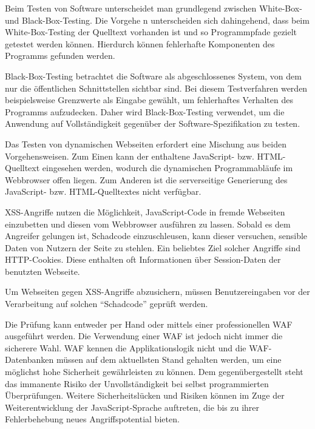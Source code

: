 Beim Testen von Software unterscheidet man grundlegend zwischen White-Box- und Black-Box-Testing. Die Vorgehe n unterscheiden sich dahingehend, dass beim White-Box-Testing der Quelltext vorhanden ist und so Programmpfade gezielt getestet werden können. Hierdurch können fehlerhafte Komponenten des Programms gefunden werden.

Black-Box-Testing betrachtet die Software als abgeschlossenes System, von dem nur die öffentlichen Schnittstellen sichtbar sind. Bei diesem Testverfahren werden beispielsweise Grenzwerte als Eingabe gewählt, um fehlerhaftes Verhalten des Programms aufzudecken. Daher wird Black-Box-Testing verwendet, um die Anwendung auf Vollständigkeit gegenüber der Software-Spezifikation zu testen.

Das Testen von dynamischen Webseiten erfordert eine Mischung aus beiden Vorgehensweisen. Zum Einen kann der enthaltene JavaScript- bzw. HTML-Quelltext eingesehen werden, wodurch die dynamischen Programmabläufe im Webbrowser offen liegen. Zum Anderen ist die serverseitige Generierung des JavaScript- bzw. HTML-Quelltextes nicht verfügbar.

XSS-Angriffe nutzen die Möglichkeit, JavaScript-Code in fremde Webseiten einzubetten und diesen vom Webbrowser ausführen zu lassen. Sobald es dem Angreifer gelungen ist, Schadcode einzuschleusen, kann dieser versuchen, sensible Daten von Nutzern der Seite zu stehlen. Ein beliebtes Ziel solcher Angriffe sind HTTP-Cookies. Diese enthalten oft Informationen über Session-Daten der benutzten Webseite. 

Um Webseiten gegen XSS-Angriffe abzusichern, müssen Benutzereingaben vor der Verarbeitung auf solchen ``Schadcode'' geprüft werden.

Die Prüfung kann entweder per Hand oder mittels einer professionellen \ac{WAF} ausgeführt werden. Die Verwendung einer \ac{WAF} ist jedoch nicht immer die sicherere Wahl. \ac{WAF} kennen die Applikationslogik nicht und die \ac{WAF}-Datenbanken müssen auf dem aktuellsten Stand gehalten werden, um eine möglichst hohe Sicherheit gewährleisten zu können. Dem gegenübergestellt steht das immanente Risiko der Unvollständigkeit bei selbst programmierten Überprüfungen. Weitere Sicherheitslücken und Risiken können im Zuge der Weiterentwicklung der JavaScript-Sprache auftreten, die bis zu ihrer Fehlerbehebung neues Angriffspotential bieten.


